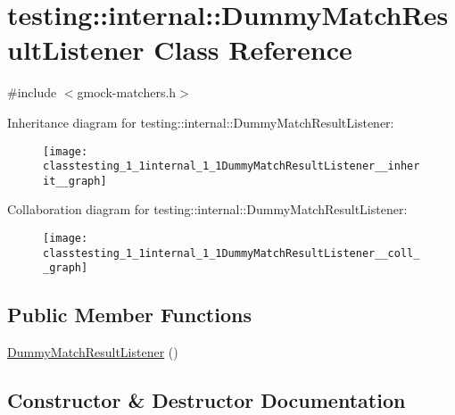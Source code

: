 \hypertarget{classtesting_1_1internal_1_1DummyMatchResultListener}{}\section{testing\+:\+:internal\+:\+:Dummy\+Match\+Result\+Listener Class Reference}
\label{classtesting_1_1internal_1_1DummyMatchResultListener}


{\ttfamily \#include $<$gmock-\/matchers.\+h$>$}



Inheritance diagram for testing\+:\+:internal\+:\+:Dummy\+Match\+Result\+Listener\+:\nopagebreak
\begin{figure}[H]
\begin{center}
\leavevmode
\texttt{[image: classtesting\_1\_1internal\_1\_1DummyMatchResultListener\_\_inherit\_\_graph]}
\end{center}
\end{figure}


Collaboration diagram for testing\+:\+:internal\+:\+:Dummy\+Match\+Result\+Listener\+:\nopagebreak
\begin{figure}[H]
\begin{center}
\leavevmode
\texttt{[image: classtesting\_1\_1internal\_1\_1DummyMatchResultListener\_\_coll\_\_graph]}
\end{center}
\end{figure}
\subsection*{Public Member Functions}
\begin{DoxyCompactItemize}
\item 
\hyperlink{classtesting_1_1internal_1_1DummyMatchResultListener_a3284ab25167628be9a92e4ee5d2042fe}{Dummy\+Match\+Result\+Listener} ()
\end{DoxyCompactItemize}


\subsection{Constructor \& Destructor Documentation}
